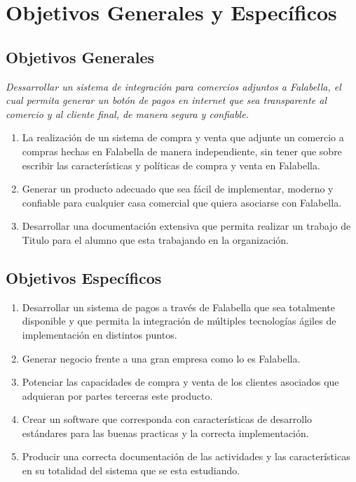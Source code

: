 \documentclass[a4paper,12pt,openany,oneside]{book}
\begin{document}
\section{Objetivos Generales y Específicos}
\subsection{Objetivos Generales}
\textit{Dessarrollar un sistema de integración para comercios adjuntos a Falabella, el cual permita generar un botón de pagos en internet que sea transparente al comercio y al cliente final, de manera segura y confiable.}
\begin{enumerate}
\item La realización de un sistema de compra y venta que adjunte un comercio a compras hechas en Falabella de manera independiente, sin tener que sobre escribir las características y políticas de compra y venta en Falabella.
\item Generar un producto adecuado que sea fácil de implementar, moderno y confiable para cualquier casa comercial que quiera asociarse con Falabella.
\item Desarrollar una documentación extensiva que permita realizar un trabajo de Titulo para el alumno que esta trabajando en la organización.
\end{enumerate}
\subsection{Objetivos Específicos}
\begin{enumerate}
\item Desarrollar un sistema de pagos a través de Falabella que sea totalmente disponible y que permita la integración de múltiples tecnologías ágiles de implementación en distintos puntos.
\item Generar negocio frente a una gran empresa como lo es Falabella.
\item Potenciar las capacidades de compra y venta de los clientes asociados que adquieran por partes terceras este producto.
\item Crear un software que corresponda con características de desarrollo estándares para las buenas practicas y la correcta implementación.
\item Producir una correcta documentación de las actividades y las características en su totalidad del sistema que se esta estudiando.
\end{enumerate}
\end{document}
